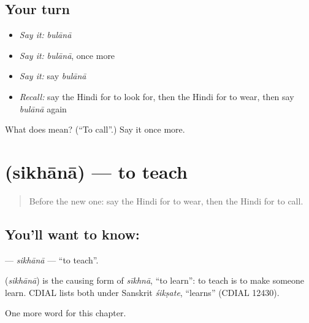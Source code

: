 \subsection*{Your turn}
\begin{itemize}
\raggedright
  \item \emph{Say it:} \emph{bulānā}
  \item \emph{Say it:} \emph{bulānā}, once more
  \item \emph{Say it:} say \emph{bulānā}
  \item \emph{Recall:} say the Hindi for to look for, then the Hindi for to wear, then say \emph{bulānā} again
\end{itemize}

\begin{tcolorbox}[breakable,colback=teal!4,colframe=teal!35!black,title={Before you move on}]
What does  mean? (\textquotedblleft{}To call\textquotedblright{}.) Say it once more.
\end{tcolorbox}
\section[\texorpdfstring{\hi{सिखाना} (sikhānā)}{सिखाना (sikhānā)}]{ (sikhānā) — to teach}

\label{lesson:HI-C164-sikhana}



\begin{quote}
Before the new one: say the Hindi for to wear, then the Hindi for to call.
\end{quote}

\subsection*{You'll want to know: }
\textbf{} — \emph{sikhānā} — \textquotedblleft{}to teach\textquotedblright{}.

\begin{cousinweb}
\textbf{} (\emph{sikhānā}) is the causing form of \emph{sīkhnā}, \textquotedblleft{}to learn\textquotedblright{}: to teach is to make someone learn. CDIAL lists both under Sanskrit \emph{śikṣate}, \textquotedblleft{}learns\textquotedblright{} (CDIAL 12430).
\end{cousinweb}

\begin{grammarlens}[title={What you've built}]
One more word for this chapter.
\end{grammarlens}

